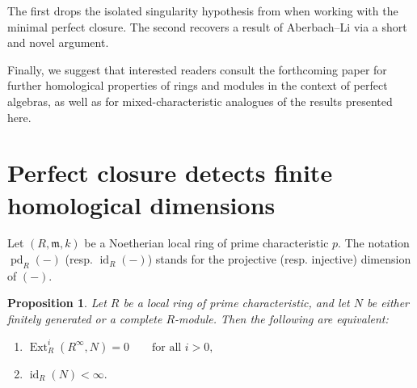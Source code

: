 \documentclass[11pt,a4paper]{amsart}
\numberwithin{equation}{section}
\newtheorem{proposition}[theorem]{Proposition}
\theoremstyle{definition}
\theoremstyle{remark}
\newcommand{\id}{\operatorname{id}}
\newcommand{\pd}{\operatorname{pd}}
\begin{document}
The first drops the isolated singularity hypothesis from \cite{Ryo} when working with the minimal perfect closure. 
The second recovers a result of Aberbach--Li \cite{Ab} via a short and novel argument.

 Finally, we suggest that interested readers consult the forthcoming paper \cite{Ryo} for further homological properties of rings and modules in the context of perfect algebras, as well as for mixed-characteristic analogues of the results presented here.
	\maketitle
		\section{Perfect closure detects finite homological dimensions}
	
	
	
Let $(R,\mathfrak m,k)$ be a Noetherian local ring of  prime characteristic $p$.
The notation \(\pd_R(-)\) (resp. \(\id_R(-)\)) stands for the projective (resp. injective) dimension of \((-)\).

\begin{proposition}
	Let $R$ be a local ring of prime characteristic, and let
	$N$ be  either finitely generated  or a complete $R$-module. Then the following are equivalent:
	
	\begin{enumerate}
		\item
$
		\operatorname{Ext}_R^i(R^\infty,N)=0
		\qquad\text{for all } i>0,
	$
		
		\item
$
		\operatorname{id}_R(N)<\infty.
$
	\end{enumerate}
\end{proposition}
\end{document}
